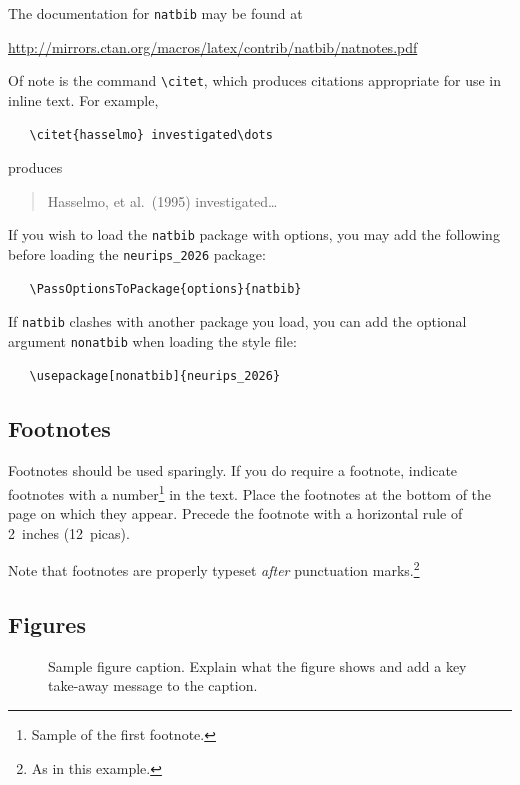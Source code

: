 \documentclass{article}
\begin{document}
The documentation for \verb+natbib+ may be found at
\begin{center}
  \url{http://mirrors.ctan.org/macros/latex/contrib/natbib/natnotes.pdf}
\end{center}
Of note is the command \verb+\citet+, which produces citations appropriate for
use in inline text.  For example,
\begin{verbatim}
   \citet{hasselmo} investigated\dots
\end{verbatim}
produces
\begin{quote}
  Hasselmo, et al.\ (1995) investigated\dots
\end{quote}


If you wish to load the \verb+natbib+ package with options, you may add the
following before loading the \verb+neurips_2026+ package:
\begin{verbatim}
   \PassOptionsToPackage{options}{natbib}
\end{verbatim}


If \verb+natbib+ clashes with another package you load, you can add the optional
argument \verb+nonatbib+ when loading the style file:
\begin{verbatim}
   \usepackage[nonatbib]{neurips_2026}
\end{verbatim}



\subsection{Footnotes}


Footnotes should be used sparingly.  If you do require a footnote, indicate
footnotes with a number\footnote{Sample of the first footnote.} in the
text. Place the footnotes at the bottom of the page on which they appear.
Precede the footnote with a horizontal rule of 2~inches (12~picas).


Note that footnotes are properly typeset \emph{after} punctuation
marks.\footnote{As in this example.}


\subsection{Figures}


\begin{figure}
  \centering
  \fbox{\rule[-.5cm]{0cm}{4cm} \rule[-.5cm]{4cm}{0cm}}
  \caption{Sample figure caption. Explain what the figure shows and add a key take-away message to the caption.}
\end{figure}
\end{document}
